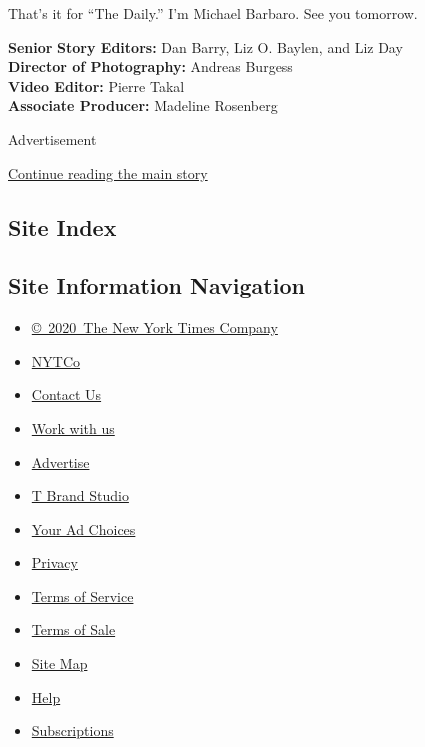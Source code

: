 That's it for ``The Daily.'' I'm Michael Barbaro. See you tomorrow.

\textbf{Senior} \textbf{Story Editors:} Dan Barry, Liz O. Baylen, and
Liz Day\\
\textbf{Director of Photography:} Andreas Burgess\\
\textbf{Video Editor:} Pierre Takal\\
\textbf{Associate Producer:} Madeline Rosenberg

Advertisement

\protect\hyperlink{after-bottom}{Continue reading the main story}

\hypertarget{site-index}{%
\subsection{Site Index}\label{site-index}}

\hypertarget{site-information-navigation}{%
\subsection{Site Information
Navigation}\label{site-information-navigation}}

\begin{itemize}
\tightlist
\item
  \href{https://help.nytimes3xbfgragh.onion/hc/en-us/articles/115014792127-Copyright-notice}{©~2020~The
  New York Times Company}
\end{itemize}

\begin{itemize}
\tightlist
\item
  \href{https://www.nytco.com/}{NYTCo}
\item
  \href{https://help.nytimes3xbfgragh.onion/hc/en-us/articles/115015385887-Contact-Us}{Contact
  Us}
\item
  \href{https://www.nytco.com/careers/}{Work with us}
\item
  \href{https://nytmediakit.com/}{Advertise}
\item
  \href{http://www.tbrandstudio.com/}{T Brand Studio}
\item
  \href{https://www.nytimes3xbfgragh.onion/privacy/cookie-policy\#how-do-i-manage-trackers}{Your
  Ad Choices}
\item
  \href{https://www.nytimes3xbfgragh.onion/privacy}{Privacy}
\item
  \href{https://help.nytimes3xbfgragh.onion/hc/en-us/articles/115014893428-Terms-of-service}{Terms
  of Service}
\item
  \href{https://help.nytimes3xbfgragh.onion/hc/en-us/articles/115014893968-Terms-of-sale}{Terms
  of Sale}
\item
  \href{https://spiderbites.nytimes3xbfgragh.onion}{Site Map}
\item
  \href{https://help.nytimes3xbfgragh.onion/hc/en-us}{Help}
\item
  \href{https://www.nytimes3xbfgragh.onion/subscription?campaignId=37WXW}{Subscriptions}
\end{itemize}
